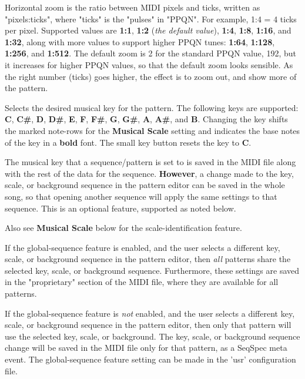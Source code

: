    Horizontal zoom is the ratio between MIDI pixels and ticks, written as
   "pixels:ticks", where "ticks" is the "pulses" in "PPQN".
   For example, 1:4 = 4 ticks per pixel.
   Supported values are
   \textbf{1:1}, \textbf{1:2} (\textsl{the default value}),
   \textbf{1:4}, \textbf{1:8}, \textbf{1:16},
   and \textbf{1:32}, along with
   more values to support higher PPQN tunes:
   \textbf{1:64}, \textbf{1:128}, \textbf{1:256}, and \textbf{1:512}.
   The default zoom is 2 for the standard PPQN value, 192, but it
   increases for higher PPQN values, so that the default zoom looks sensible.
   As the right number (ticks) goes higher,
   the effect is to zoom out, and show more of the pattern.

   Selects the desired musical key for the pattern.  The following keys are
   supported:
   \textbf{C}, \textbf{C\#},
   \textbf{D}, \textbf{D\#},
   \textbf{E}, \textbf{F}, \textbf{F\#},
   \textbf{G}, \textbf{G\#},
   \textbf{A}, \textbf{A\#},
   and \textbf{B}.
   Changing the key shifts the marked note-rows
   for the \textbf{Musical Scale} setting and indicates the base notes
   of the key in a \textbf{bold} font.
   The small key button resets the key to \textbf{C}.

   The musical key that a sequence/pattern is set to is
   saved in the MIDI file along with the rest of the data for the sequence.
   \textbf{However},
   a change made to the key, scale, or background sequence in
   the pattern editor can be saved in the whole song,
   so that opening another sequence
   will apply the same settings to that sequence.  This is an optional feature,
   supported as noted below.

   Also see \textbf{Musical Scale} below for the scale-identification feature.

   If the global-sequence feature is enabled, and the user selects
   a different key, scale, or background sequence in the pattern editor, 
   then \textsl{all} patterns share the selected key, scale, or background
   sequence.  Furthermore, these settings are saved in the "proprietary"
   section of the MIDI file, where they are available for all patterns.

   If the global-sequence feature is \textsl{not} enabled, and the user selects
   a different key, scale, or background sequence in the pattern editor, 
   then only that pattern will use the selected key, scale, or background.
   The key, scale, or background sequence change will be saved in the MIDI file
   only for that pattern, as a SeqSpec meta event.
   The global-sequence feature setting can be made in the 'usr' configuration
   file.

